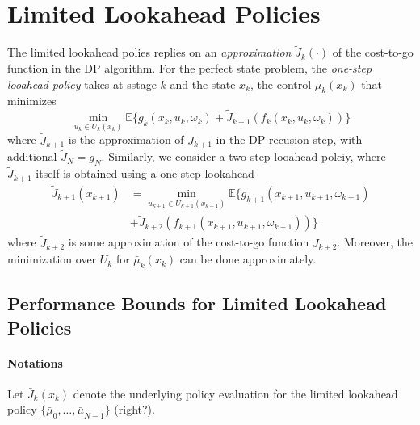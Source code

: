 \section{Limited Lookahead Policies}
The limited lookahead polies replies on an \emph{approximation}
$\tilde{J}_k(\cdot)$ of the cost-to-go function in the DP algorithm.
For the perfect state problem, the \emph{one-step looahead policy} takes at sstage $k$ and the state $x_k$, the control $\bar{\mu}_k(x_k)$ that minimizes
\begin{equation}
\min_{u_k\in U_k(x_k)}\mathbb{E}\Bigg\{
g_k(x_k,u_k,\omega_k)+\tilde{J}_{k+1}(f_k(x_k,u_k,\omega_k))
\Bigg\}
\end{equation}
where $\tilde{J}_{k+1}$ is the approximation of $J_{k+1}$ in the DP recusion step, with additional $\tilde{J}_N=g_N$.
Similarly, we consider a two-step looahead polciy, where $\tilde{J}_{k+1}$ itself is obtained using a one-step lookahead
\begin{align*}
\tilde{J}_{k+1}(x_{k+1})&=\min_{u_{k+1}\in U_{k+1}(x_{k+1})}
\mathbb{E}\Bigg\{
g_{k+1}(x_{k+1},u_{k+1},\omega_{k+1})\\
&+\tilde{J}_{k+2}(f_{k+1}(x_{k+1},u_{k+1},\omega_{k+1}))
\Bigg\}
\end{align*}
where $\tilde{J}_{k+2}$ is some approximation of the cost-to-go function $J_{k+2}$.
Moreover, the minimization over $U_k$ for $\bar{\mu}_k(x_k)$ can be done approximately.
\subsection{Performance Bounds for Limited Lookahead Policies}
\paragraph{Notations}
Let $\bar{J}_k(x_k)$ denote the underlying policy evaluation for the limited lookahead policy $\{\bar{\mu}_0,\dots,\bar{\mu}_{N-1}\}$ (right?).

